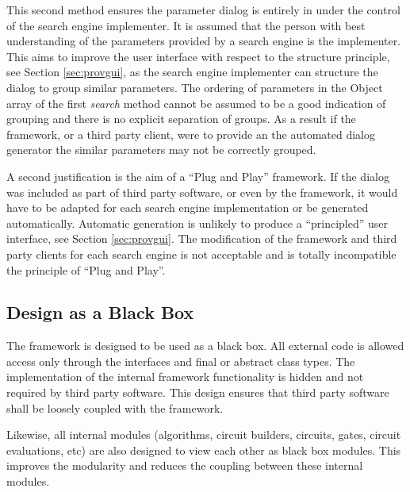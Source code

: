 This second method ensures the parameter dialog is entirely in under the control of the search engine implementer.
It is assumed that the person with best understanding of the parameters provided by a search engine is the implementer.
This aims to improve the user interface with respect to the structure principle, see Section \ref{sec:provgui}, as the search engine implementer can structure the dialog to group similar parameters.
The ordering of parameters in the Object array of the first \emph{search} method cannot be assumed to be a good indication of grouping and there is no explicit separation of groups.
As a result if the framework, or a third party client, were to provide an the automated dialog generator the similar parameters may not be correctly grouped.

A second justification is the aim of a ``Plug and Play'' framework.
If the dialog was included as part of third party software, or even by the framework, it would have to be adapted for each search engine implementation or be generated automatically.
Automatic generation is unlikely to produce a ``principled'' user interface, see Section \ref{sec:provgui}.
The modification of the framework and third party clients for each search engine is not acceptable and is totally incompatible the principle of ``Plug and Play''.

\subsection{Design as a Black Box}
\label{sec:thirdpartyblackbox}
The framework is designed to be used as a black box.
All external code is allowed access only through the interfaces and final or abstract class types.
The implementation of the internal framework functionality is hidden and not required by third party software.
This design ensures that third party software shall be loosely coupled with the framework.

Likewise, all internal modules (algorithms, circuit builders, circuits, gates, circuit evaluations, etc) are also designed to view each other as black box modules.
This improves the modularity and reduces the coupling between these internal modules.

